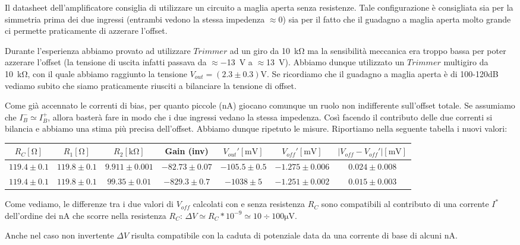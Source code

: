 Il datasheet dell'amplificatore consiglia di utilizzare un circuito a maglia aperta senza resistenze. Tale configurazione è consigliata sia per la simmetria prima dei due ingressi (entrambi vedono la stessa impedenza $\approx 0$) sia per il fatto che il guadagno a maglia aperta molto grande ci permette praticamente di azzerare l'offset. 

Durante l'esperienza abbiamo provato ad utilizzare $Trimmer$ ad un giro da \SI{10}{\kilo\ohm} ma la sensibilità meccanica era troppo bassa per poter azzerare l'offset (la tensione di uscita infatti passava da $\approx$\SI{-13}{\volt} a $\approx$\SI{+13}{\volt}). Abbiamo dunque utilizzato un $Trimmer$ multigiro da \SI{10}{\kilo\ohm}, con il quale abbiamo raggiunto la tensione $V_{out}= (2.3\pm0.3)\si{\volt}$. Se ricordiamo che il guadagno a maglia aperta è di 100-120dB vediamo subito che siamo praticamente riusciti a bilanciare la tensione di offset.

Come già accennato le correnti di bias, per quanto piccole (\si{\nano\ampere}) giocano comunque un ruolo non indifferente sull'offset totale. Se assumiamo che $I_B^- \simeq I_B^+ $, allora basterà fare in modo che i due ingressi vedano la stessa impedenza. Così facendo il contributo delle due correnti si bilancia e abbiamo una stima più precisa dell'offset. Abbiamo dunque ripetuto le misure. Riportiamo nella seguente tabella i nuovi valori:

\begin{tabular}{c|c|c|c|c|c|c}
$R_C [\si{\ohm}]$& $R_1[\si{\ohm}]$ & $R_2[\si{\kilo\ohm}]$ & Gain (inv) & $V_{out}' [\si{\milli\volt}]$ & $V_{off}' [\si{\milli\volt}]$ & $|V_{off}-V_{off}'|[\si{\milli\volt}]$ \\ 
\hline 
$119.4\pm0.1$ & $119.8\pm0.1$ & $9.911\pm0.001$  & $-82.73\pm0.07$ & $-105.5 \pm 0.5$ & $-1.275 \pm0.006$ & $0.024\pm0.008$ \\
\hline
$119.4\pm0.1$ & $119.8\pm0.1$ & $99.35\pm0.01$  & $-829.3\pm0.7$ &$ -1038 \pm 5$ & $-1.251 \pm 0.002$ & $0.015 \pm 0.003 $	\\

\end{tabular}

Come vediamo, le differenze tra i due valori di $V_{off}$ calcolati con e senza resistenza $R_C$ sono compatibili al contributo di una corrente $I^*$ dell'ordine dei \si{\nano\ampere} che scorre nella resistenza $R_C$: $\Delta V \simeq R_C * 10^{-9} \simeq 10\div100 \si{\micro\volt}$.

Anche nel caso non invertente $\Delta V$ risulta compatibile con la caduta di potenziale data da una corrente di base di alcuni \si{\nano\ampere}.